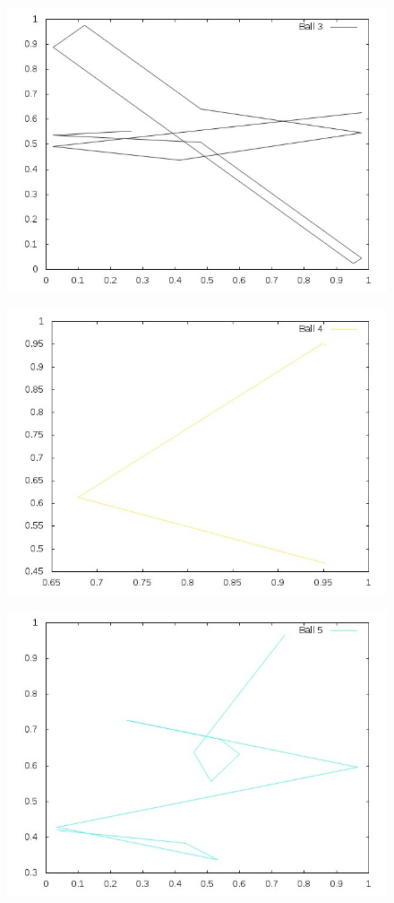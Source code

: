 \documentclass[12pt]{article}
\begin{document}
\begin{figure}[ht!]
\centering
\includegraphics[width=12cm]{plot3.jpg}
\end{figure}

\begin{figure}[ht!]
\centering
\includegraphics[width=12cm]{plot4.jpg}
\end{figure}

\begin{figure}[ht!]
\centering
\includegraphics[width=12cm]{plot5.jpg}
\end{figure}
\end{document}
